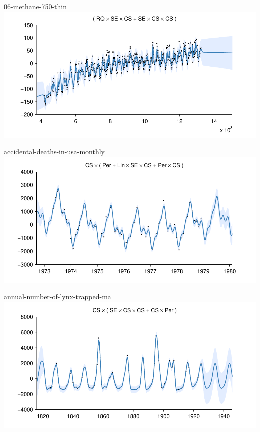     
\begin{frame}{06-methane-750-thin}
  \center
  \includegraphics[width=1.0\textwidth]{figures/06-methane-750-thin/06-methane-750-thin_all}
\end{frame}  


    
\begin{frame}{accidental-deaths-in-usa-monthly}
  \center
  \includegraphics[width=1.0\textwidth]{figures/accidental-deaths-in-usa-monthly/accidental-deaths-in-usa-monthly_all}
\end{frame}  


    
\begin{frame}{annual-number-of-lynx-trapped-ma}
  \center
  \includegraphics[width=1.0\textwidth]{figures/annual-number-of-lynx-trapped-ma/annual-number-of-lynx-trapped-ma_all}
\end{frame}  


